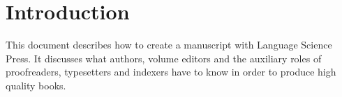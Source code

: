 \chapter{Introduction}
This document describes how to create a manuscript with Language Science Press. It discusses what authors, volume editors and the auxiliary roles of proofreaders, typesetters and indexers have to know in order to produce high quality books.
